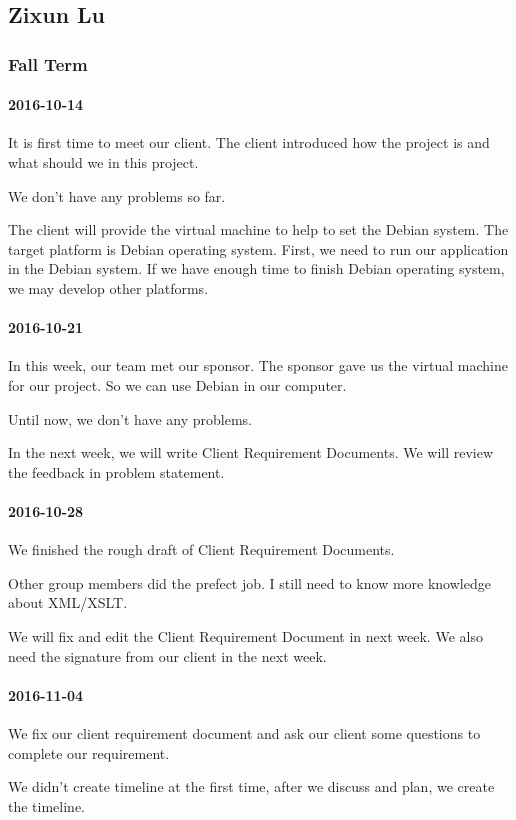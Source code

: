 \subsection{Zixun Lu}

\subsubsection{Fall Term}

\paragraph{2016-10-14}
It is first time to meet our client. The client introduced how the project is and what should we in this project.

We don't have any problems so far.

The client will provide the virtual machine to help to set the Debian system. The target platform is Debian operating system. First, we need to run our application in the Debian system. If we have enough time to finish Debian operating system, we may develop other platforms.
\paragraph{2016-10-21}
In this week, our team met our sponsor. The sponsor gave us the virtual machine for our project. So we can use Debian in our computer.

Until now, we don't have any problems.

In the next week, we will write Client Requirement Documents. We will review the feedback in problem statement.
\paragraph{2016-10-28}
We finished the rough draft of Client Requirement Documents.

Other group members did the prefect job. I still need to know more knowledge about XML/XSLT.

We will fix and edit the Client Requirement Document in next week. We also need the signature from our client in the next week.
\paragraph{2016-11-04}
We fix our client requirement document and ask our client some questions to complete our requirement.

We didn't create timeline at the first time, after we discuss and plan, we create the timeline.

